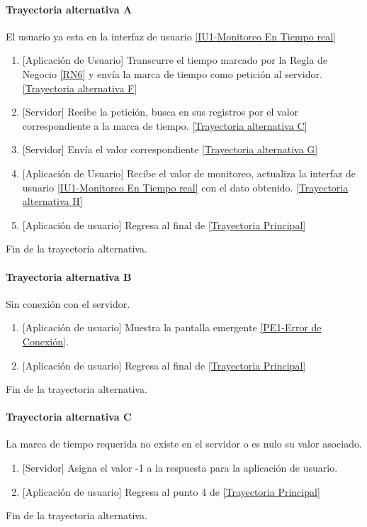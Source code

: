 \paragraph{Trayectoria alternativa A} \label{SUB-M-CU5:TA}
	El usuario ya esta en la interfaz de usuario \hyperref[fig:monitoreo]{[IU1-Monitoreo En Tiempo real]}
	\begin{enumerate}[label=A\arabic*.]
		\item {[Aplicación de Usuario]} Transcurre el tiempo marcado por la Regla de Negocio \ref{RN6} y envía la marca de tiempo como petición al servidor. \hyperref[SUB-M-CU5:TF]{[Trayectoria alternativa F]} 
		\item {[Servidor]} Recibe la petición, busca en sus registros por el valor correspondiente a la marca de tiempo. \hyperref[SUB-M-CU5:TC]{[Trayectoria alternativa C]} 
		\item  {[Servidor]} Envía el valor correspondiente \hyperref[SUB-M-CU5:TG]{[Trayectoria alternativa G]}
        \item {[Aplicación de Usuario]} Recibe el valor de monitoreo, actualiza la interfaz de usuario \hyperref[fig:monitoreo]{[IU1-Monitoreo En Tiempo real]} con el dato obtenido.
        \hyperref[SUB-M-CU5:TH]{[Trayectoria alternativa H]}
        \item {[Aplicación de usuario]} Regresa al final de \hyperref[SUB-M-CU5:TP]{[Trayectoria Principal]}
	\end{enumerate}
	Fin de la trayectoria alternativa.

\paragraph{Trayectoria alternativa B} \label{SUB-M-CU5:TB}
	Sin conexión con el servidor.
	\begin{enumerate}[label=B\arabic*.]
		\item {[Aplicación de usuario]} Muestra la pantalla emergente \hyperref[fig:Error de Conexion]{[PE1-Error de Conexión]}.
		\item {[Aplicación de usuario]} Regresa al final de \hyperref[SUB-M-CU5:TP]{[Trayectoria Principal]}
	\end{enumerate}
	Fin de la trayectoria alternativa.

\paragraph{Trayectoria alternativa C} \label{SUB-M-CU5:TC}
	La marca de tiempo requerida no existe en el servidor o es nulo su valor asociado.
	\begin{enumerate}[label=C\arabic*.]
		\item {[Servidor]} Asigna el valor -1 a la respuesta para la aplicación de usuario.
		\item {[Aplicación de usuario]} Regresa al punto 4 de \hyperref[SUB-M-CU5:TP]{[Trayectoria Principal]}
	\end{enumerate}
	Fin de la trayectoria alternativa.

